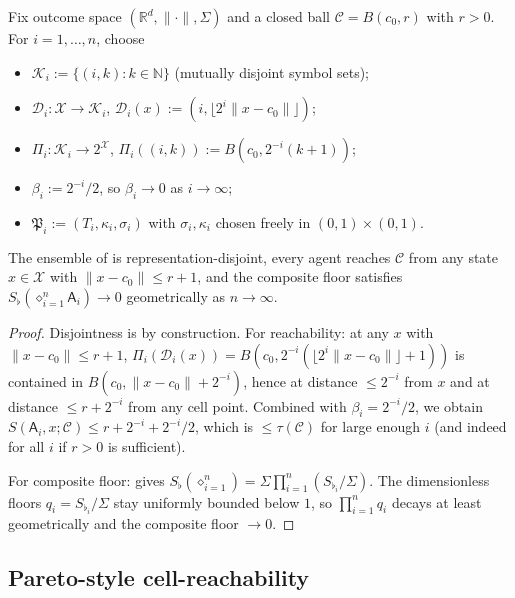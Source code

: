 \documentclass[11pt,a4paper]{article}
\newcommand{\R}{\mathbb{R}}
\newcommand{\N}{\mathbb{N}}
\newcommand{\K}{\mathcal{K}}
\newcommand{\D}{\mathcal{D}}
\newcommand{\X}{\mathcal{X}}
\newcommand{\Cell}{\mathcal{C}}
\newcommand{\Method}{\mathfrak{P}}
\newcommand{\agent}{\mathsf{A}}
\newcommand{\Sfloor}{S_{\flat}}
\newcommand{\norm}[1]{\lVert#1\rVert}
\newcommand{\Compose}{\diamond}
\begin{document}
\begin{construction}\label{con:disjoint}
Fix outcome space $(\R^d,\norm{\cdot},\Sigma)$ and a closed ball
$\Cell=B(c_0,r)$ with $r>0$. For $i=1,\dots,n$, choose
\begin{itemize}[leftmargin=*]
\item $\K_i:=\{(i,k):k\in\N\}$ (mutually disjoint symbol sets);
\item $\D_i:\X\to\K_i$, $\D_i(x):=(i,\lfloor 2^i\norm{x-c_0}\rfloor)$;
\item $\Pi_i:\K_i\to 2^\X$, $\Pi_i((i,k)):=B(c_0,2^{-i}(k+1))$;
\item $\beta_i:=2^{-i}/2$, so $\beta_i\to 0$ as $i\to\infty$;
\item $\Method_i:=(T_i,\kappa_i,\sigma_i)$ with
$\sigma_i,\kappa_i$ chosen freely in $(0,1)\times(0,1)$.
\end{itemize}
\end{construction}

\begin{proposition}\label{prop:con-valid}
The ensemble of  is representation-disjoint, every
agent reaches $\Cell$ from any state $x\in\X$ with
$\norm{x-c_0}\le r+1$, and the composite floor satisfies
$\Sfloor(\Compose_{i=1}^n\agent_i)\to 0$ geometrically as
$n\to\infty$.
\end{proposition}

\begin{proof}
Disjointness is by construction. For reachability: at any
$x$ with $\norm{x-c_0}\le r+1$, $\Pi_i(\D_i(x))=B(c_0,2^{-i}
(\lfloor 2^i\norm{x-c_0}\rfloor+1))$ is contained in
$B(c_0,\norm{x-c_0}+2^{-i})$, hence at distance $\le 2^{-i}$ from
$x$ and at distance $\le r+2^{-i}$ from any cell point. Combined with
$\beta_i=2^{-i}/2$, we obtain $S(\agent_i,x;\Cell)\le r+
2^{-i}+2^{-i}/2$, which is $\le\tau(\Cell)$ for large enough $i$ (and
indeed for all $i$ if $r>0$ is sufficient).

For composite floor:  gives
$\Sfloor(\Compose_{i=1}^n)=\Sigma\prod_{i=1}^n(\Sfloor_i/\Sigma)$.
The dimensionless floors $q_i=\Sfloor_i/\Sigma$ stay uniformly
bounded below $1$, so $\prod_{i=1}^n q_i$ decays at least
geometrically and the composite floor $\to 0$.
\end{proof}

\subsection{Pareto-style cell-reachability}
\end{document}
